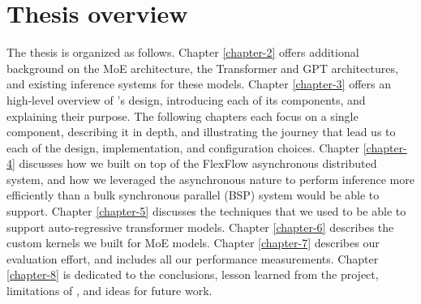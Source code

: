 \section{Thesis overview}
The thesis is organized as follows. Chapter \ref{chapter-2} offers additional background on the MoE architecture, the Transformer and GPT architectures, and existing inference systems for these models. Chapter \ref{chapter-3} offers an high-level overview of \Project's design, introducing each of its components, and explaining their purpose. The following chapters each focus on a single component, describing it in depth, and illustrating the journey that lead us to each of the design, implementation, and configuration choices. Chapter \ref{chapter-4} discusses how we built \Project on top of the FlexFlow asynchronous distributed system, and how we leveraged the asynchronous nature to perform inference more efficiently than a bulk synchronous parallel (BSP) system would be able to support. Chapter \ref{chapter-5} discusses the techniques that we used to be able to support auto-regressive transformer models.  Chapter \ref{chapter-6} describes the custom kernels we built for MoE models. Chapter \ref{chapter-7} describes our evaluation effort, and includes all our performance measurements. Chapter \ref{chapter-8} is dedicated to the conclusions, lesson learned from the project, limitations of \Project, and ideas for future work. 